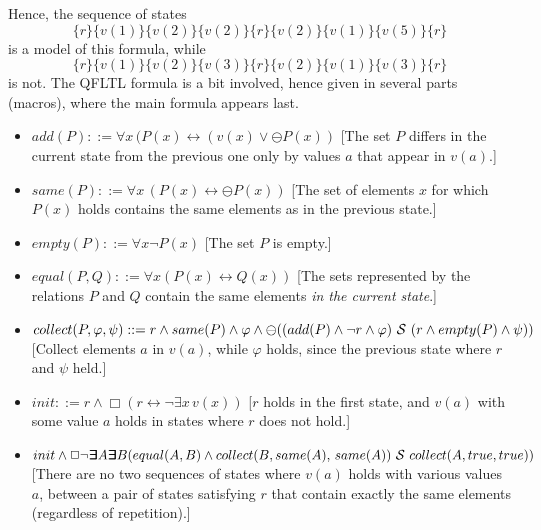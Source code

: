 \documentclass{llncs}
\newcommand{\Exists}{\bm{\exists}\kern-0.6em\bm{\exists}}
\begin{document}

Hence, the sequence of states 
\[ \{ r \} \{ v(1) \}  \{ v(2) \}  \{ v(2) \}  \{ r\}  \{ v(2) \}  \{  v(1) \}  \{  v(5) \}  \{  r \}\]
is a model of this formula, while 
\[ \{ r \} \{ v(1) \}  \{ v(2) \} \{ v(3) \}  \{ r\}  \{ v(2) \}  \{  v(1) \}  \{  v(3) \} \{  r \} \]
is not.
The QFLTL formula is a bit involved, hence given in several parts (macros), where the main formula appears last.

\begin{itemize}
\item $add(P) ::= \forall x \, (P(x) \leftrightarrow (v(x) \vee \ominus P(x))$ [The set $P$ differs in the current state from the previous one only by values $a$ that appear in $v(a)$.]
\item $same(P) ::= \forall x \, (P(x) \leftrightarrow \ominus P(x))$ 
[The set of elements $x$ for which
$P (x)$ holds
contains the same elements as in the previous state.]
\item $empty (P) ::= \forall x \neg P(x)$ [The set $P$ is empty.]
\item $equal (P,Q) ::= \forall x (P(x) \leftrightarrow Q(x))$ 
[The sets represented by the relations
$P$ and $Q$ contain the same elements {\em in the current state}.]
\item $collect(P, \varphi, \psi) ::=
       r \wedge same(P) \wedge \varphi \wedge 
       \ominus ((add(P)\wedge \neg r \wedge \varphi) \ {\cal S} \ (r \wedge empty(P) \wedge \psi))$  [Collect elements $a$ in $v(a)$, while $\varphi$ holds, 
       since the previous state where $r$ 
       and $\psi$ held.]
\item $init ::= r \wedge \Box (r \leftrightarrow \neg \exists x \, v(x))$ [$r$ holds in the first state, and $v(a)$ with some value $a$ holds in states where $r$ does not hold.]
\item $init \wedge \Box \neg \Exists A \Exists B (equal (A, B) \wedge \\
collect(B, same(A),\, same(A)) \ \since \ collect(A, true, true))$
[There are no two sequences of states where $v(a)$ holds
with various values $a$, between a pair of states satisfying $r$ that contain exactly the same elements (regardless of repetition).]
\end{itemize}


\end{document}
